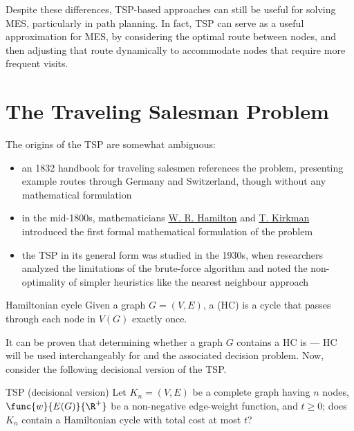 \documentclass[a4paper, 12pt]{report}
\begin{document}
    Despite these differences, TSP-based approaches can still be useful for solving MES, particularly in path planning. In fact, TSP can serve as a useful approximation for MES, by considering the optimal route between nodes, and then adjusting that route dynamically to accommodate nodes that require more frequent visits.

    \section{The Traveling Salesman Problem}

    The origins of the TSP are somewhat ambiguous:

    \begin{itemize}
        \item an 1832 handbook for traveling salesmen references the problem, presenting example routes through Germany and Switzerland, though without any mathematical formulation
        \item in the mid-1800s, mathematicians \href{https://en.wikipedia.org/wiki/William_Rowan_Hamilton}{W. R. Hamilton} and \href{https://en.wikipedia.org/wiki/Thomas_Kirkman}{T. Kirkman} introduced the first formal mathematical formulation of the problem
        \item the TSP in its general form was studied in the 1930s, when researchers analyzed the limitations of the brute-force algorithm and noted the non-optimality of simpler heuristics like the nearest neighbour approach
    \end{itemize}

    \begin{frameddefn}{Hamiltonian cycle}
        Given a graph $G = (V,E)$, a  (HC) is a cycle that passes through each node in $V(G)$ exactly once.
    \end{frameddefn}

    It can be proven that determining whether a graph $G$ contains a HC is \NPComplete --- HC will be used interchangeably for  and the associated decision problem. Now, consider the following decisional version of the TSP.

    \begin{frameddefn}{TSP (decisional version)}
        Let $K_n = (V, E)$ be a complete graph having $n$ nodes, $\func{w}{E(G)}{\R^+}$ be a non-negative edge-weight function, and $t \ge 0$; does $K_n$ contain a Hamiltonian cycle with total cost at most $t$?
    \end{frameddefn}
\end{document}
